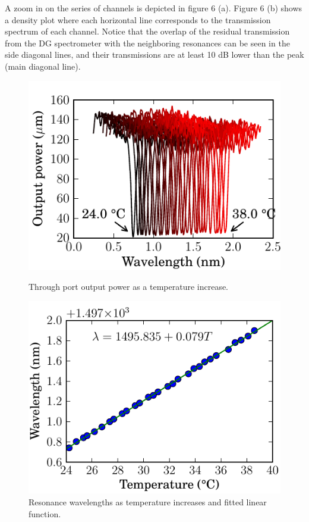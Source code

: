 \documentclass[12pt,twoside,english]{book}
\renewcommand{\~}{\perispomeni}%
\numberwithin{equation}{section}
\numberwithin{figure}{section}
\begin{document}
A zoom in on the series of channels is depicted in figure 6 (a). Figure 6 (b) shows a density plot where each horizontal line corresponds to the transmission spectrum of each channel. Notice that the overlap of the residual transmission from the DG spectrometer with the neighboring resonances can be seen in the side diagonal lines, and their transmissions are at least 10 dB lower than the peak (main diagonal line).


\begin{figure}[H]
	\begin{minipage}[t]{0.49\columnwidth}%
		\includegraphics{resonance-tempshift}\caption{Through port output power as a temperature increase.\label{fig:resonance-tempshift}}
	\end{minipage}\hfill{}%
	\begin{minipage}[t]{0.49\columnwidth}%
		\includegraphics{tempshift-fit}\caption{Resonance wavelengths as temperature increases and fitted linear function.\label{fig:tempshift-fit}}
	\end{minipage}
\end{figure}
\end{document}
